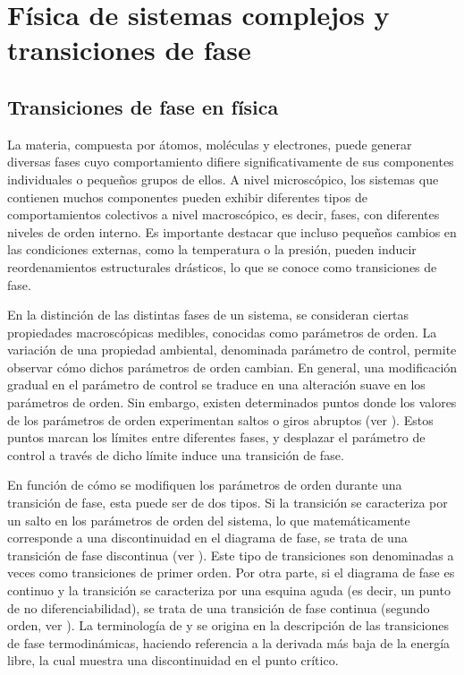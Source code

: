 \section{Física de sistemas complejos y transiciones de fase}

\subsection{Transiciones de fase en física}

La materia, compuesta por átomos, moléculas y electrones, puede generar diversas fases cuyo comportamiento difiere significativamente de sus componentes individuales o pequeños grupos de ellos. A nivel microscópico, los sistemas que contienen muchos componentes pueden exhibir diferentes tipos de comportamientos colectivos a nivel macroscópico, es decir, fases, con diferentes niveles de orden interno. Es importante destacar que incluso pequeños cambios en las condiciones externas, como la temperatura o la presión, pueden inducir reordenamientos estructurales drásticos, lo que se conoce como transiciones de fase.

En la distinción de las distintas fases de un sistema, se consideran ciertas propiedades macroscópicas medibles, conocidas como parámetros de orden. La variación de una propiedad ambiental, denominada parámetro de control, permite observar cómo dichos parámetros de orden cambian. En general, una modificación gradual en el parámetro de control se traduce en una alteración suave en los parámetros de orden. Sin embargo, existen determinados puntos donde los valores de los parámetros de orden experimentan saltos o giros abruptos (ver ). Estos puntos marcan los límites entre diferentes fases, y desplazar el parámetro de control a través de dicho límite induce una transición de fase.

En función de cómo se modifiquen los parámetros de orden durante una transición de fase, esta puede ser de dos tipos. Si la transición se caracteriza por un salto en los parámetros de orden del sistema, lo que matemáticamente corresponde a una discontinuidad en el diagrama de fase, se trata de una transición de fase discontinua (ver  ). Este tipo de transiciones son denominadas a veces como transiciones de primer orden. Por otra parte, si el diagrama de fase es continuo y la transición se caracteriza por una esquina aguda (es decir, un punto de no diferenciabilidad), se trata de una transición de fase continua (segundo orden, ver ). La terminología de  y  se origina en la descripción de las transiciones de fase termodinámicas, haciendo referencia a la derivada más baja de la energía libre, la cual muestra una discontinuidad en el punto crítico.


